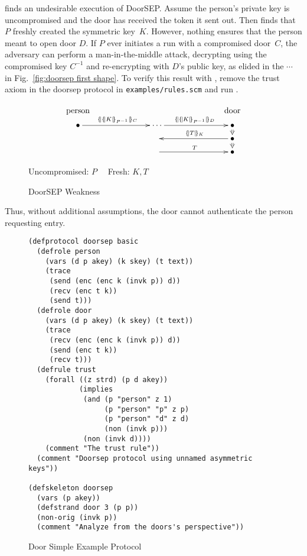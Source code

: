 {\cpsa} finds an undesirable execution of DoorSEP.  Assume the
person's private key  is uncompromised and the door has received
the token it sent out.  Then {\cpsa} finds that~$P$ freshly created
the symmetric key~$K$.  However, nothing ensures that the person meant
to open door $D$.  If $P$ ever initiates a run with a compromised
door~$C$, the adversary can perform a man-in-the-middle attack,
decrypting using the compromised key $C^{-1}$ and re-encrypting with
$D$'s public key, as elided in the $\cdots$ in Fig.~\ref{fig:doorsep
  first shape}.  To verify this result with {\cpsa}, remove the trust
axiom in the doorsep protocol in \texttt{examples/rules.scm} and run
{\cpsa}.
%
\begin{figure}[tb]
  \[\xymatrix@R=2mm@C=7em{
    \txt{\strut person}&&\txt{\strut door}\\
    \bullet \ar[r]^{\enc{\enc{K}{\iv{P}}}{C}} & \cdots\ar[r]^{\enc{\enc{K}{\iv{P}}}{D}} &
    \bullet\ar@{=>}[d] \\
    & \null &   \bullet\ar@{=>}[d]\ar[l]_{\enc{T}{K}}\\
    &\null\ar[r]^T & \bullet}\]
  \begin{center}
    Uncompromised: $P\quad$ Fresh: $K, T$
  \end{center}
  \caption{DoorSEP Weakness}\label{fig:doorsep first shape}
\end{figure}
%
%
Thus, without additional assumptions, the door cannot authenticate the
person requesting entry.

\begin{figure}\small
\begin{verbatim}
(defprotocol doorsep basic
  (defrole person
    (vars (d p akey) (k skey) (t text))
    (trace
     (send (enc (enc k (invk p)) d))
     (recv (enc t k))
     (send t)))
  (defrole door
    (vars (d p akey) (k skey) (t text))
    (trace
     (recv (enc (enc k (invk p)) d))
     (send (enc t k))
     (recv t)))
  (defrule trust
    (forall ((z strd) (p d akey))
            (implies
             (and (p "person" z 1)
                  (p "person" "p" z p)
                  (p "person" "d" z d)
                  (non (invk p)))
             (non (invk d))))
    (comment "The trust rule"))
  (comment "Doorsep protocol using unnamed asymmetric keys"))

(defskeleton doorsep
  (vars (p akey))
  (defstrand door 3 (p p))
  (non-orig (invk p))
  (comment "Analyze from the doors's perspective"))
\end{verbatim}
\caption{Door Simple Example Protocol}\label{fig:doorsep}
\end{figure}

